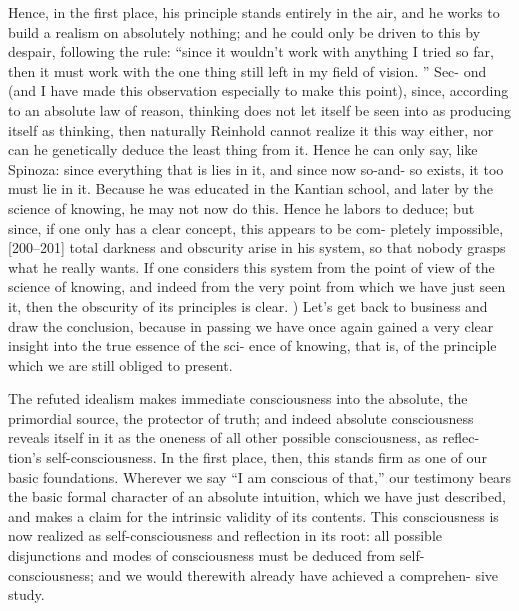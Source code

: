 Hence, in the first place, his principle stands entirely in the air, and he works
to build a realism on absolutely nothing; and he could only be driven to this
by despair, following the rule: “since it wouldn’t work with anything I tried so
far, then it must work with the one thing still left in my field of vision.
” Sec-
ond (and I have made this observation especially to make this point), since,
according to an absolute law of reason, thinking does not let itself be seen into
as producing itself as thinking, then naturally Reinhold cannot realize it this
way either, nor can he genetically deduce the least thing from it.
Hence he can
only say, like Spinoza: since everything that is lies in it, and since now so-and-
so exists, it too must lie in it.
Because he was educated in the Kantian school,
and later by the science of knowing, he may not now do this.
Hence he labors
to deduce; but since, if one only has a clear concept, this appears to be com-
pletely impossible, [200–201] total darkness and obscurity arise in his system,
so that nobody grasps what he really wants.
If one considers this system from
the point of view of the science of knowing, and indeed from the very point
from which we have just seen it, then the obscurity of its principles is clear.
)
Let’s get back to business and draw the conclusion, because in passing
we have once again gained a very clear insight into the true essence of the sci-
ence of knowing, that is, of the principle which we are still obliged to present.

The refuted idealism makes immediate consciousness into the absolute, the
primordial source, the protector of truth; and indeed absolute consciousness
reveals itself in it as the oneness of all other possible consciousness, as reflec-
tion’s self-consciousness.
In the first place, then, this stands firm as one of our
basic foundations.
Wherever we say “I am conscious of that,” our testimony
bears the basic formal character of an absolute intuition, which we have just
described, and makes a claim for the intrinsic validity of its contents.
This
consciousness is now realized as self-consciousness and reflection in its root: all
possible disjunctions and modes of consciousness must be deduced from self-
consciousness; and we would therewith already have achieved a comprehen-
sive study.

